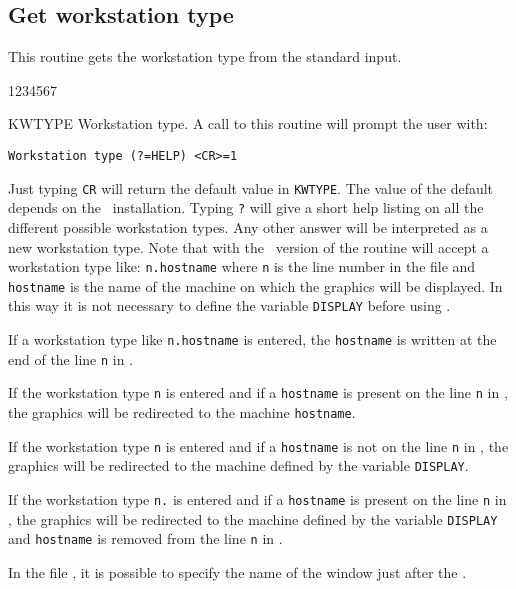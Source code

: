 \subsection{Get workstation type}
\Action
This routine gets the workstation type from the standard input.
\Pdesc
\begin{DLtt}{1234567}
\item[KWTYPE] Workstation type. A call to this routine will prompt the user
              with:
\begin{verbatim}
Workstation type (?=HELP) <CR>=1
\end{verbatim}
Just typing {\tt CR} will return the default value in {\tt KWTYPE}. The value of
the default depends on the \HIGZ~installation. Typing {\tt ?} will give a short
help listing on all the different possible workstation types. Any other answer
will be interpreted as a new workstation type. Note that with the ~version
of \HIGZ{} the routine  will accept a workstation type like:
{\tt n.hostname} where {\tt n} is the line number in the file \HW{} and
{\tt hostname} is the name of the machine on which the graphics will be
displayed. In this way it is not necessary to define the variable {\tt DISPLAY}
before using \HIGZ.

\begin{ULc}
\item   If a workstation type like {\tt n.hostname} is entered,
        the {\tt hostname} is written at the end of the line {\tt n} in \HW.
\item   If the workstation type {\tt n} is entered and if a {\tt hostname} is
        present on the line {\tt n} in \HW, the graphics will be redirected
        to the machine
        {\tt hostname}.
\item   If the workstation type {\tt n} is entered and if a {\tt hostname} is
        not on the line {\tt n} in \HW, the graphics  will be redirected
        to the ma\-chi\-ne de\-fi\-ned by the va\-ria\-ble {\tt DIS\-PLAY}.
\item   If the workstation type {\tt n.} is entered and if a {\tt hostname} is
        present on the line {\tt n} in \HW, the graphics  will be redirected
        to the machine defined by the variable {\tt DISPLAY} and {\tt hostname}
        is removed from the line {\tt n} in \HW.
\end{ULc}
\end{DLtt}
\Remark
In the file \HW, it is possible to specify the name of the window just after
the .
%
\newpage
